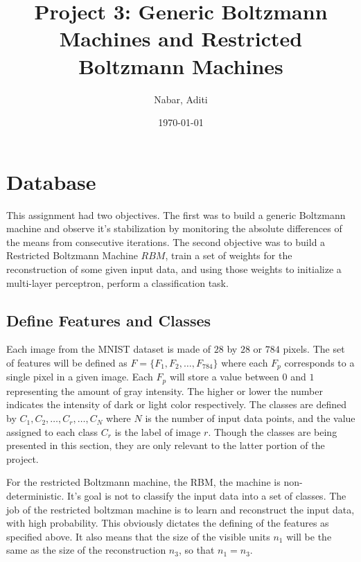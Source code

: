 \documentclass[11pt]{amsart}
\theoremstyle{remark}
\theoremstyle{remark}
\numberwithin{equation}{section}
\begin{document}
\title{Project 3: Generic Boltzmann Machines and Restricted Boltzmann Machines}
\author{Nabar, Aditi}

\date{\today}

\maketitle


\section{Database}

	This assignment had two objectives. The first was to build a generic
	Boltzmann machine and observe it's stabilization by monitoring the absolute 
	differences of the means from consecutive iterations. The second objective
	was to build a Restricted Boltzmann Machine $RBM$, train a set of weights
	for the reconstruction of some given input data, and using those weights to 
	initialize a multi-layer perceptron, perform a classification task. 

  \subsection{Define Features and Classes}
    Each image from the MNIST dataset is made of $28$ by $28$ or $784$
    pixels.  The set of features will be defined as $F = \{ F_1, F_2, \dots,
    F_{784} \}$ where each $F_p$ corresponds to a single pixel in a given image. 
    Each $F_p$ will store a value between $0$ and $1$ representing the amount 
    of gray intensity.  The higher or lower the number indicates the intensity of 
    dark or light color respectively.  The classes are defined by $C_1, C_2,\dots, 
    C_r, \dots, C_N$ where
    $N$ is the number of input data points, and the value assigned to
    each class $C_r$ is the label of image $r$. Though the classes are being 
    presented in this section, they are only relevant to the latter portion of the project.
    
    For the restricted Boltzmann machine, the RBM, the machine is non-deterministic. 
    It's goal is not to classify the input data into a set of classes. The job of the 
    restricted boltzman machine is to learn and reconstruct the input data, with high 
    probability. This obviously dictates the defining of the features as specified above.
    It also means that the size of the visible units $n_1$ will be the same as the 
    size of the reconstruction $n_3$, so that $n_1 = n_3$. 
	
\end{document}

